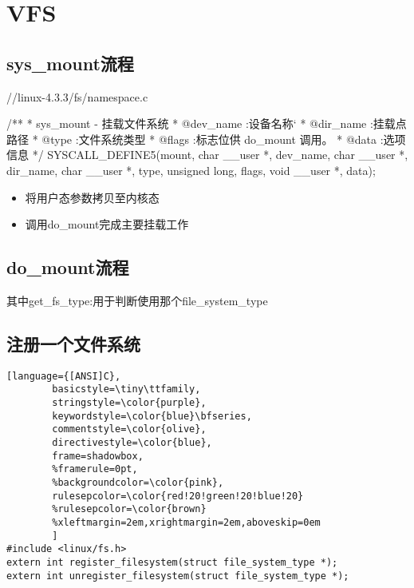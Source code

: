 \chapter{VFS}



\section{sys\_mount流程}


\begin{code}
//linux-4.3.3/fs/namespace.c

/**
 * sys_mount - 挂载文件系统
 * @dev_name :设备名称`
 * @dir_name :挂载点路径
 * @type :文件系统类型
 * @flags :标志位供 do_mount 调用。
 * @data :选项信息
 */
SYSCALL_DEFINE5(mount, char __user *, dev_name, char __user *, dir_name,
		char __user *, type, unsigned long, flags, void __user *, data);
\end{code}

\begin{itemize}
\item 将用户态参数拷贝至内核态
\item 调用do\_mount完成主要挂载工作
\end{itemize}

\section{do\_mount流程}


其中get\_fs\_type:用于判断使用那个file\_system\_type

\section{注册一个文件系统}




\begin{lstlisting}[language={[ANSI]C},
        basicstyle=\tiny\ttfamily,
        stringstyle=\color{purple},
        keywordstyle=\color{blue}\bfseries,
        commentstyle=\color{olive},
        directivestyle=\color{blue},
        frame=shadowbox,
        %framerule=0pt,
        %backgroundcolor=\color{pink},
        rulesepcolor=\color{red!20!green!20!blue!20}
        %rulesepcolor=\color{brown}
        %xleftmargin=2em,xrightmargin=2em,aboveskip=0em
        ]
#include <linux/fs.h>
extern int register_filesystem(struct file_system_type *);
extern int unregister_filesystem(struct file_system_type *);
\end{lstlisting}


